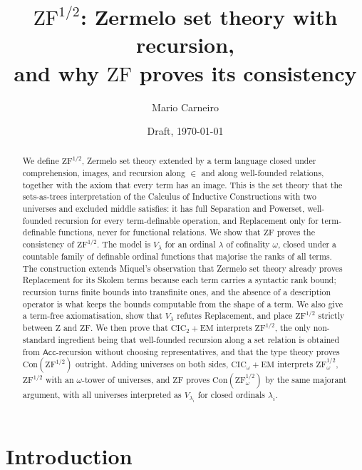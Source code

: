 \documentclass[10pt]{article}
\newcommand{\CIC}{\mathrm{CIC}}
\newcommand{\ZF}{\mathrm{ZF}}
\newcommand{\ZFh}{\mathrm{ZF}^{1/2}}
\newcommand{\Z}{\mathrm{Z}}
\newcommand{\EM}{\mathrm{EM}}
\newcommand{\Con}{\mathrm{Con}}
\begin{document}
\title{$\ZFh$: Zermelo set theory with recursion,\\
  \large and why $\ZF$ proves its consistency}
\author{Mario Carneiro}
\date{Draft, \today}
\maketitle

\begin{abstract}
We define $\ZFh$, Zermelo set theory extended by a term language closed
under comprehension, images, and recursion along $\in$ and along
well-founded relations, together with the axiom that every term has an
image. This is the set theory that the sets-as-trees interpretation of the
Calculus of Inductive Constructions with two universes and excluded middle
satisfies: it has full Separation and Powerset, well-founded recursion for
every term-definable operation, and Replacement only for term-definable
functions, never for functional relations. We show that $\ZF$ proves the
consistency of $\ZFh$. The model is $V_\lambda$ for an ordinal $\lambda$
of cofinality $\omega$, closed under a countable family of definable
ordinal functions that majorise the ranks of all terms. The construction
extends Miquel's observation that Zermelo set theory already proves
Replacement for its Skolem terms because each term carries a syntactic
rank bound; recursion turns finite bounds into transfinite ones, and the
absence of a description operator is what keeps the bounds computable
from the shape of a term. We also give a term-free axiomatisation, show
that $V_\lambda$ refutes Replacement, and place $\ZFh$ strictly between
$\Z$ and $\ZF$. We then prove that $\CIC_2+\EM$ interprets $\ZFh$, the
only non-standard ingredient being that well-founded recursion along a
set relation is obtained from $\mathsf{Acc}$-recursion without choosing
representatives, and that the type theory proves $\Con(\ZFh)$ outright.
Adding universes on both sides, $\CIC_\omega+\EM$ interprets $\ZFh_\omega$,
$\ZFh$ with an $\omega$-tower of universes, and $\ZF$ proves
$\Con(\ZFh_\omega)$ by the same majorant argument, with all universes
interpreted as $V_{\lambda_i}$ for closed ordinals $\lambda_i$.
\end{abstract}

\section{Introduction}
\end{document}
